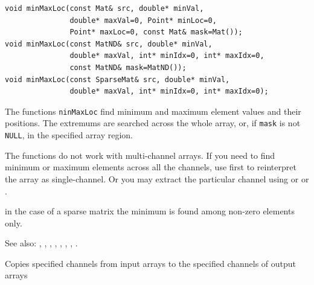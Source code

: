 \begin{lstlisting}
void minMaxLoc(const Mat& src, double* minVal,
               double* maxVal=0, Point* minLoc=0,
               Point* maxLoc=0, const Mat& mask=Mat());
void minMaxLoc(const MatND& src, double* minVal,
               double* maxVal, int* minIdx=0, int* maxIdx=0,
               const MatND& mask=MatND());
void minMaxLoc(const SparseMat& src, double* minVal,
               double* maxVal, int* minIdx=0, int* maxIdx=0);
\end{lstlisting}
\begin{description}
\end{description}

The functions \texttt{ninMaxLoc} find minimum and maximum element values
and their positions. The extremums are searched across the whole array, or,
if \texttt{mask} is not \texttt{NULL}, in the specified array region.

The functions do not work with multi-channel arrays. If you need to find minimum or maximum elements across all the channels, use  first to reinterpret the array as single-channel. Or you may extract the particular channel using  or  or .

in the case of a sparse matrix the minimum is found among non-zero elements only.

See also: , , , , , , , .

\label{mixChannels}
Copies specified channels from input arrays to the specified channels of output arrays

